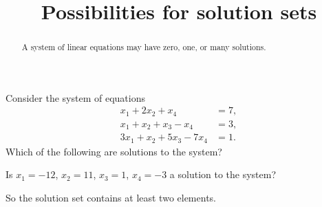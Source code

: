 \documentclass{ximera}
\title{Possibilities for solution sets}
\begin{document}
\begin{abstract}
  A system of linear equations may have zero, one, or many solutions.
\end{abstract}
\maketitle

\begin{exercise}
Consider the system of equations
\begin{align*}
x_1+2x_2 + x_4&= 7,\\
x_1+x_2+x_3-x_4&=3,\\
3x_1+x_2+5x_3-7x_4&=1.
\end{align*}
Which of the following are solutions to the system?
\begin{multipleChoice}
\end{multipleChoice}

Is $x_{1}=-12$, $x_{2}=11$, $x_{3}=1$, $x_{4}=-3$ a solution to the system?
\begin{multipleChoice}
\end{multipleChoice}

So the solution set contains at least two elements.

\end{exercise}
\end{document}
